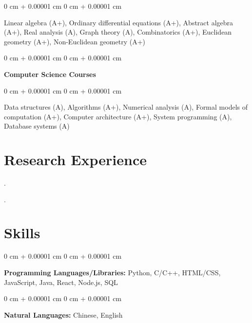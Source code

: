 \documentclass[11pt, letterpaper]{article}
\newenvironment{onecolentry}{
    \begin{adjustwidth}{
        0 cm + 0.00001 cm
    }{
        0 cm + 0.00001 cm
    }
}{
    \end{adjustwidth}
} %
\begin{document}
    \vspace{0.10 cm}
    \begin{onecolentry}
    Linear algebra (A+), Ordinary differential equations (A+), Abstract algebra (A+), Real analysis (A), Graph theory (A), Combinatorics (A+), Euclidean geometry (A+), Non-Euclidean geometry (A+)
    \end{onecolentry}

    \vspace{0.20 cm}

    \begin{onecolentry}
        \textbf{Computer Science Courses}
    \end{onecolentry}

    \vspace{0.10 cm}
    \begin{onecolentry}
        Data structures (A), Algorithms (A+), Numerical analysis (A), Formal models of computation (A+), Computer architecture (A+), System programming (A), Database systems (A)
    \end{onecolentry}


\section{Research Experience}
    .

    \vspace{0.20 cm}

    .


\section{Skills}
    \begin{onecolentry}
        \textbf{Programming Languages/Libraries:} Python, C/C++, HTML/CSS, JavaScript, Java, React, Node.js, SQL
    \end{onecolentry}

    \vspace{0.2 cm}

    \begin{onecolentry}
        \textbf{Natural Languages:} Chinese, English
    \end{onecolentry}
\end{document}
